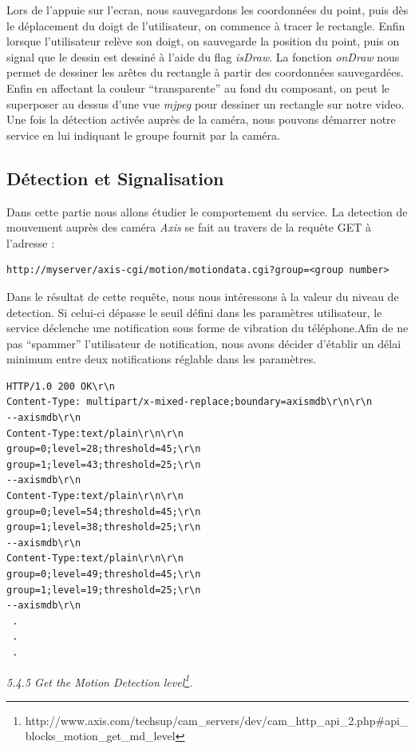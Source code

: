Lors de l'appuie sur l'ecran, nous sauvegardons les coordonnées du point, puis
dès le déplacement du doigt de l'utilisateur, on commence à tracer le rectangle.
Enfin lorsque l'utilisateur relève son doigt, on sauvegarde la position du
point, puis on signal que le dessin est dessiné à l'aide du flag
\textit{isDraw}. La fonction \textit{onDraw} nous permet de dessiner les arêtes
du rectangle à partir des coordonnées sauvegardées.\newline
\indent Enfin en affectant la couleur ``transparente'' au fond du composant, on
peut le superposer au dessus d'une vue \textit{mjpeg} pour dessiner un rectangle
sur notre video.\newline
\newline\indent Une fois la détection activée auprès de la caméra, nous pouvons
démarrer notre service en lui indiquant le groupe fournit par la caméra.

\subsection{Détection et Signalisation}
Dans cette partie nous allons étudier le comportement du service.
La detection de mouvement auprès des caméra \textit{Axis} se fait au travers de
la requête GET à l'adresse : 
\begin{lstlisting}
http://myserver/axis-cgi/motion/motiondata.cgi?group=<group number>
\end{lstlisting}
Dans le résultat de cette requête, nous nous intéressons à la valeur du niveau
de detection. Si celui-ci dépasse le seuil défini dans les paramètres
utilisateur, le service déclenche une notification sous forme de vibration du
téléphone.\newline Afin de ne pas ``spammer'' l'utilisateur de notification,
nous avons décider d'établir un délai minimum entre deux notifications réglable
dans les paramètres.
\begin{lstlisting}
HTTP/1.0 200 OK\r\n
Content-Type: multipart/x-mixed-replace;boundary=axismdb\r\n\r\n
--axismdb\r\n
Content-Type:text/plain\r\n\r\n
group=0;level=28;threshold=45;\r\n
group=1;level=43;threshold=25;\r\n
--axismdb\r\n
Content-Type:text/plain\r\n\r\n
group=0;level=54;threshold=45;\r\n
group=1;level=38;threshold=25;\r\n
--axismdb\r\n
Content-Type:text/plain\r\n\r\n
group=0;level=49;threshold=45;\r\n
group=1;level=19;threshold=25;\r\n
--axismdb\r\n
 .
 .
 . 
\end{lstlisting}
\textit{5.4.5 Get the Motion Detection
level\footnote{\label{MotionDetectionDoc}
http://www.axis.com/techsup/cam\_servers/dev/cam\_http\_api\_2.php\#api\_blocks\_motion\_get\_md\_level}.}


